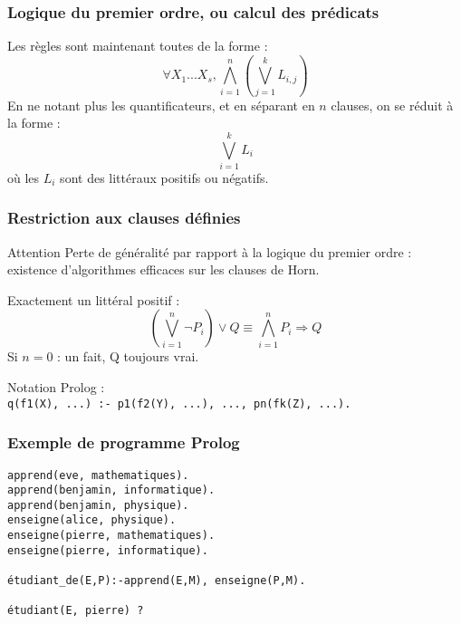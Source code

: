 \documentclass[aspectratio=43]{beamer}
\begin{document}
\begin{frame}
\frametitle{Logique du premier ordre, ou calcul des prédicats}
  Les règles sont maintenant toutes de la forme :
  $$\forall X_{1}...X_{s},\bigwedge_{i=1}^{n}\left(\bigvee_{j=1}^{k}L_{i,j}\right)$$
  En ne notant plus les quantificateurs, et en séparant en $n$ clauses, on se réduit à la forme :
  $$\bigvee_{i=1}^{k}L_{i}$$ où les $L_{i}$ sont des littéraux positifs ou négatifs.
\end{frame}

\begin{frame}
  \frametitle{Restriction aux clauses définies}
  \begin{alertblock}{Attention}
    Perte de généralité par rapport à la logique du premier ordre : existence d'algorithmes efficaces sur les clauses de Horn.
  \end{alertblock}

  Exactement un littéral positif :
  $$\left(\bigvee_{i=1}^{n}\neg P_{i}\right)\vee{Q} \equiv \bigwedge_{i=1}^{n}P_{i}\Rightarrow Q$$
  Si $n=0$ : un fait, Q toujours vrai.

  \vspace{1em}

  Notation Prolog :\\
  \texttt{q(f1(X), ...) :- p1(f2(Y), ...), ..., pn(fk(Z), ...).}
\end{frame}


\begin{frame}[fragile]
  \frametitle{Exemple de programme Prolog}
\begin{verbatim}
apprend(eve, mathematiques).
apprend(benjamin, informatique).
apprend(benjamin, physique).
enseigne(alice, physique).
enseigne(pierre, mathematiques).
enseigne(pierre, informatique).

étudiant_de(E,P):-apprend(E,M), enseigne(P,M).

étudiant(E, pierre) ?
\end{verbatim}
\end{frame}
\end{document}
